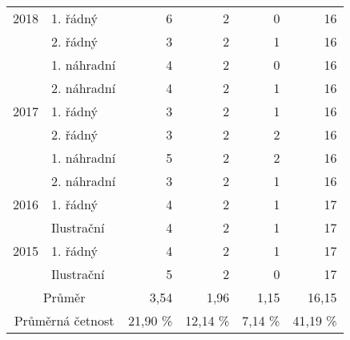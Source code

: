 \begin{table}[p]
\begin{center}
\begin{tabular}{|l|l|r|r|r|r|}
            \multicolumn{ 1}{|c|}{2018} & 1. řádný    & 6 & 2 & 0 & 16 \\ \cline{ 2- 6}
            \multicolumn{ 1}{|l|}{}     & 2. řádný    & 3 & 2 & 1 & 16 \\ \cline{ 2- 6}
            \multicolumn{ 1}{|l|}{}     & 1. náhradní & 4 & 2 & 0 & 16 \\ \cline{ 2- 6}
            \multicolumn{ 1}{|l|}{}     & 2. náhradní & 4 & 2 & 1 & 16 \\ \hline
            \multicolumn{ 1}{|c|}{2017} & 1. řádný    & 3 & 2 & 1 & 16 \\ \cline{ 2- 6}
            \multicolumn{ 1}{|l|}{}     & 2. řádný    & 3 & 2 & 2 & 16 \\ \cline{ 2- 6}
            \multicolumn{ 1}{|l|}{}     & 1. náhradní & 5 & 2 & 2 & 16 \\ \cline{ 2- 6}
            \multicolumn{ 1}{|l|}{}     & 2. náhradní & 3 & 2 & 1 & 16 \\ \hline
            \multicolumn{ 1}{|c|}{2016} & 1. řádný    & 4 & 2 & 1 & 17 \\ \cline{ 2- 6}
            \multicolumn{ 1}{|l|}{}     & Ilustrační  & 4 & 2 & 1 & 17 \\ \hline
            \multicolumn{ 1}{|c|}{2015} & 1. řádný    & 4 & 2 & 1 & 17 \\ \cline{ 2- 6}
            \multicolumn{ 1}{|l|}{}     & Ilustrační  & 5 & 2 & 0 & 17 \\ \hline
            \multicolumn{ 2}{|c|}{Průměr} & 3,54 & 1,96 & 1,15 & 16,15 \\ \hline
            \multicolumn{ 2}{|c|}{Průměrná četnost} & 21,90 \% & 12,14 \% & 7,14 \% & 41,19 \% \\ \hline
        \end{tabular}
    \end{center}
    \label{tab:4ulo}
\end{table}

